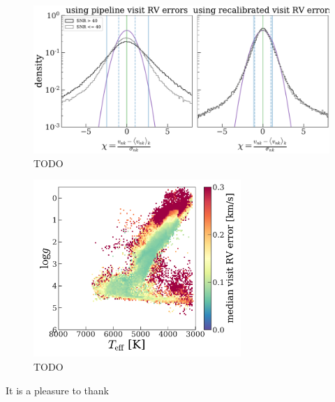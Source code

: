 \begin{figure}[!t]
\begin{center}
\includegraphics[width=\textwidth]{chi-distr.pdf}
\end{center}
\caption{%
TODO
\label{fig:chiplots}
}
\end{figure}


\begin{figure}[!t]
\begin{center}
\includegraphics[width=0.7\textwidth]{mean-visit-rv-err.pdf}
\end{center}
\caption{%
TODO
\label{fig:mean-rv-err}
}
\end{figure}



\acknowledgements

It is a pleasure to thank


